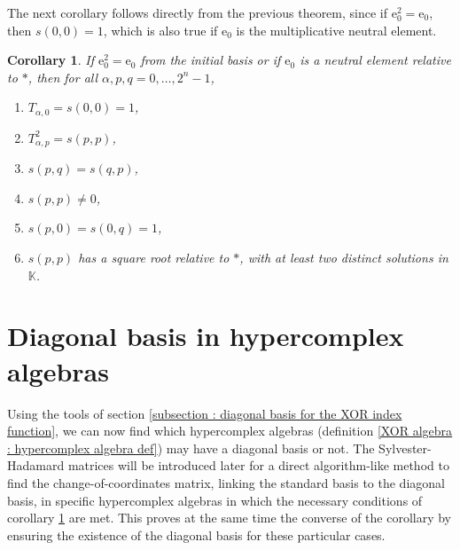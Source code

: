 \documentclass{article}
\newtheorem{corollary}[theorem]{Corollary}
\begin{document}
The next corollary follows directly from the previous theorem, since if $\mathrm e_0^2 = \mathrm e_0$, then $s(0,0) = 1$, which is also true if $\mathrm e_0$ is the multiplicative neutral element.
\begin{corollary}
    \label{XOR diagonal basis : corollary}
    If $\mathrm e_0^2 = \mathrm e_0$ from the initial basis or if $\mathrm e_0$ is a neutral element relative to $*$, then for all $\alpha, p, q = 0,\ldots, 2^n-1$,
    \begin{enumerate}
        \item $T_{\alpha,0} = s(0,0) = 1$,
        \item $T_{\alpha,p}^2 = s(p,p)$,
        \item $s(p,q) = s(q,p)$,
        \item $s(p,p) \neq 0$,
        \item $s(p,0) = s(0,q) = 1$,
        \item $s(p,p)$ has a square root relative to $*$, with at least two distinct solutions in $\mathbb{K}$.
    \end{enumerate}
\end{corollary}

\sloppy\section{Diagonal basis in hypercomplex algebras}
\label{Diagonal basis in hypercomplex algebras}

Using the tools of section \ref{subsection : diagonal basis for the XOR index function}, we can now find which hypercomplex algebras (definition \ref{XOR algebra : hypercomplex algebra def}) may have a diagonal basis or not. The Sylvester-Hadamard matrices will be introduced later for a direct algorithm-like method to find the change-of-coordinates matrix, linking the standard basis to the diagonal basis, in specific hypercomplex algebras in which the necessary conditions of corollary \ref{XOR diagonal basis : corollary} are met. This proves at the same time the converse of the corollary by ensuring the existence of the diagonal basis for these particular cases.
\end{document}
